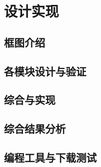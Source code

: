 \section{设计实现}

\subsection{框图介绍}

\subsection{各模块设计与验证}

\subsection{综合与实现}

\subsection{综合结果分析}

\subsection{编程工具与下载测试}
